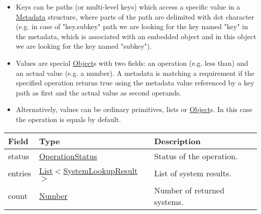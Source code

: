 \documentclass[a4paper]{arrowhead}
\newcommand{\pref}[1]{{\textcolor{ArrowheadGrey}{\hyperref[sec:model:primitives:#1]{#1}}}}
\begin{document}
\begin{itemize}
    \item Keys can be paths (or multi-level keys) which access a specific value in a \hyperref[sec:model:Metadata]{Metadata} structure, where parts of the path are delimited with dot character (e.g. in case of "key.subkey" path we are looking for the key named "key" in the metadata, which is associated with an embedded object and in this object we are looking for the key named "subkey").
    \item Values are special \pref{Object}s with two fields: an operation (e.g. less than) and an actual value (e.g. a number). A metadata is matching a requirement if the specified operation returns true using the metadata value referenced by a key path as first and the actual value as second operands. 
    \item Alternatively, values can be ordinary primitives, lists or \pref{Object}s. In this case the operation is equals by default.
\end{itemize}


\begin{table}[ht!]
\begin{tabularx}{\textwidth}{| p{3cm} | p{6cm} | X |} \hline
\rowcolor{gray!33} Field & Type      & Description \\ \hline
status & \pref{OperationStatus} & Status of the operation. \\ \hline
entries & \pref{List}$<$\hyperref[sec:model:SystemLookupResult]{SystemLookupResult}$>$     & List of system results. \\ \hline
count & \pref{Number} & Number of returned systems. \\ \hline
\end{tabularx}
\end{table}

\clearpage

 
\end{document}
